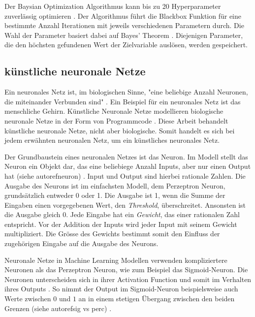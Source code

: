 Der Baysian Optimization Algorithmus kann bis zu 20 Hyperparameter zuverlässig
optimieren \cite{moriconi_high-dimensional_2020}. Der Algorithmus führt die Blackbox Funktion für eine
bestimmte Anzahl Iterationen mit jeweils verschiedenen Parametern durch. Die
Wahl der Parameter basiert dabei auf Bayes' Theorem \cite[S. 7]{garnett_bayesian_nodate}.
Diejenigen Parameter, die den höchsten gefundenen Wert der Zielvariable
auslösen, werden gespeichert.


\subsection{künstliche neuronale Netze}\label{sub:t_ml_nn} Ein neuronales Netz
ist, im biologischen Sinne, "eine beliebige Anzahl Neuronen, die miteinander
Verbunden sind" \cite{noauthor_neuronales_2021}. Ein Beispiel für ein neuronales
Netz ist das menschliche Gehirn. Künstliche Neuronale Netze modellieren
biologische neuronale Netze in der Form von Programmcode
\cite{noauthor_artificial_nodate}. Diese Arbeit behandelt künstliche neuronale
Netze, nicht aber biologische. Somit handelt es sich bei jedem erwähnten
neuronalen Netz, um ein künstliches neuronales Netz.

Der Grundbaustein eines neuronalen Netzes ist das Neuron. Im Modell stellt das
Neuron ein Objekt dar, das eine beliebiege Anzahl Inputs, aber nur einen Output
hat (siehe autoref{neuron}) \cite{pramoditha_concept_2021}. Input und Output
sind hierbei rationale Zahlen. Die Ausgabe des Neurons ist im einfachsten
Modell, dem Perzeptron Neuron, grundsätzlich entweder 0 oder 1. Die Ausgabe ist
1, wenn die Summe der Eingaben einen vorgegebenen Wert, den \emph{Threshold},
überschreitet. Ansonsten ist die Ausgabe gleich 0. Jede Eingabe hat ein
\emph{Gewicht}, das einer rationalen Zahl entspricht. Vor der Addition der
Inputs wird jeder Input mit seinem Gewicht multipliziert.  Die Grösse des
Gewichts bestimmt somit den Einfluss der zugehörigen Eingabe auf die Ausgabe des
Neurons. \cite{nielsen_neural_2015}\cite{simplilearn_what_2021}


Neuronale Netze in Machine Learning Modellen verwenden kompliziertere Neuronen
als das Perzeptron Neuron, wie zum Beispiel das Sigmoid-Neuron. Die Neuronen
unterscheiden sich in ihrer Activation Function und somit im Verhalten ihres
Outputs \cite{pragati_baheti_activation_2022}. So nimmt der Output im Sigmoid-Neuron
beispielsweise auch Werte zwischen $0$ und $1$ an in einem stetigen Übergang
zwischen den beiden Grenzen (siehe autoref{sig vs perc}) \cite{kumar_sigmoid_2019}.

